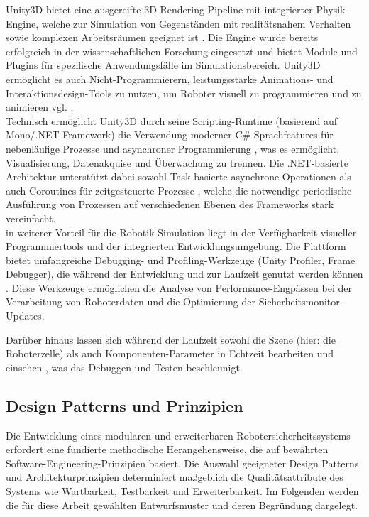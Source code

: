 \noindent
Unity3D bietet eine ausgereifte 3D-Rendering-Pipeline mit integrierter
Physik-Engine, welche zur Simulation von Gegenständen mit realitätsnahem
Verhalten sowie komplexen Arbeitsräumen geeignet ist .
Die Engine wurde bereits erfolgreich in der wissenschaftlichen Forschung
eingesetzt und bietet Module und Plugins für spezifische Anwendungsfälle im
Simulationsbereich. Unity3D ermöglicht es auch Nicht-Programmierern,
leistungsstarke Animations- und Interaktionsdesign-Tools zu nutzen, um Roboter
visuell zu programmieren und zu animieren vgl. .\\

\noindent
Technisch ermöglicht Unity3D durch seine Scripting-Runtime (basierend auf
Mono/.NET Framework) die Verwendung moderner C\#-Sprachfeatures für
nebenläufige Prozesse und asynchroner Programmierung
, was es ermöglicht, Visualisierung,
Datenakquise und Überwachung zu trennen. Die .NET-basierte Architektur
unterstützt dabei sowohl Task-basierte asynchrone Operationen als auch
Coroutines für zeitgesteuerte Prozesse
, welche die notwendige periodische
Ausführung von Prozessen auf verschiedenen Ebenen des Frameworks stark
vereinfacht.\\

\noindent
in weiterer Vorteil für die Robotik-Simulation liegt in der
Verfügbarkeit visueller Programmiertools und der integrierten
Entwicklungsumgebung. Die Plattform bietet umfangreiche Debugging- und
Profiling-Werkzeuge (Unity Profiler, Frame Debugger), die während der
Entwicklung und zur Laufzeit genutzt werden können
. Diese Werkzeuge ermöglichen die
Analyse von Performance-Engpässen bei der Verarbeitung von Roboterdaten und die
Optimierung der Sicherheitsmonitor-Updates.

Darüber hinaus lassen sich während der Laufzeit sowohl die Szene (hier: die
Roboterzelle) als auch Komponenten-Parameter in Echtzeit bearbeiten und
einsehen , was das Debuggen und Testen
beschleunigt.

\subsection{Design Patterns und Prinzipien}

Die Entwicklung eines modularen und erweiterbaren Robotersicherheitssystems
erfordert eine fundierte methodische Herangehensweise, die auf bewährten
Software-Engineering-Prinzipien basiert. Die Auswahl geeigneter Design Patterns
und Architekturprinzipien determiniert maßgeblich die Qualitätsattribute des
Systems wie Wartbarkeit, Testbarkeit und
Erweiterbarkeit. Im Folgenden werden die für diese
Arbeit gewählten Entwurfsmuster und deren Begründung dargelegt.

